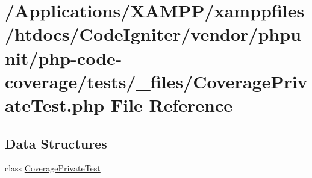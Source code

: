 \hypertarget{php-code-coverage_2tests_2__files_2_coverage_private_test_8php}{}\section{/\+Applications/\+X\+A\+M\+P\+P/xamppfiles/htdocs/\+Code\+Igniter/vendor/phpunit/php-\/code-\/coverage/tests/\+\_\+files/\+Coverage\+Private\+Test.php File Reference}
\label{php-code-coverage_2tests_2__files_2_coverage_private_test_8php}
\subsection*{Data Structures}
\begin{DoxyCompactItemize}
\item 
class \mbox{\hyperlink{class_coverage_private_test}{Coverage\+Private\+Test}}
\end{DoxyCompactItemize}
